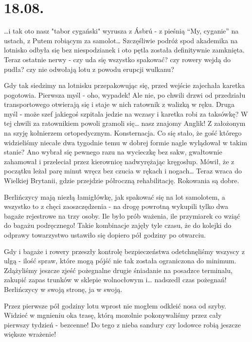 \chapter*{18.08.}

…i tak oto nasz "tabor cygański" wyrusza z Ásbrú - z pieśnią “My, cyganie” na ustach, z Putem robiącym za samolot… Szczęśliwie podróż spod akademika na lotnisko odbyła się bez niespodzianek i oto pętla została definitywnie zamknięta. Teraz ostatnie nerwy - czy uda się wszystko spakować? czy rowery wejdą do pudła? czy nie odwołają lotu z powodu erupcji wulkanu?

Gdy tak siedzimy na lotnisku przepakowując się, przed wejście zajechała karetka pogotowia. Pierwsza myśl - oho, wypadek! Ale nie, po chwili drzwi od przedziału transportowego otwierają się i staje w nich ratownik z walizką w ręku. Druga myśl - może szef jakiegoś szpitala jedzie na wczasy i karetka robi za taksówkę? W tej chwili za ratownikiem powoli gramoli się… nasz znajomy Anglik! Z założonym na szyję kołnierzem ortopedycznym. Konsternacja. Co się stało, że gość którego widzieliśmy niecałe dwa tygodnie temu w dobrej formie nagle wylądował w takim stanie? Ano wybrał się pewnego razu na wycieczkę bez sakw, gwałtownie zahamował i przeleciał przez kierownicę nadwyrężając kręgosłup. Mówił, że z początku leżał parę minut wręcz bez czucia w rękach i nogach… Teraz wraca do Wielkiej Brytanii, gdzie przejdzie półroczną rehabilitację. Rokowania są dobre.

Berlińczycy mają niezłą łamigłówkę, jak spakować się na lot samolotem, a wszystko to z chęci zaoszczędzenia - na drogę powrotną wykupili tylko dwa bagaże rejestrowe na trzy osoby. Ile było prób ważenia, ile przymiarek co wziąć do bagażu podręcznego! Takie kombinacje zajęły tyle czasu, że do kolejki do odprawy towarzystwo ustawiło się dopiero pół godziny po otwarciu.


Gdy i bagaże i rowery przeszły kontrolę bezpieczeństwa odetchnęliśmy wszyscy z ulgą - ilość spraw, które mogą pójść nie tak została ograniczona do minimum. Zdążyliśmy jeszcze zjeść pożegnalne drugie śniadanie na posadzce terminalu, zakupić zapas trunków w sklepie wolnocłowym i… nadszedł czas pożegnań! Berlińczycy w swoją stronę, ja w swoją.

Przez pierwsze pół godziny lotu wprost nie mogłem odkleić nosa od szyby. Widzieć w mgnieniu oka trasę, którą mozolnie pokonywaliśmy przez cały pierwszy tydzień - bezcenne! Do tego z nieba sandury czy lodowce robią jeszcze większe wrażenie!

